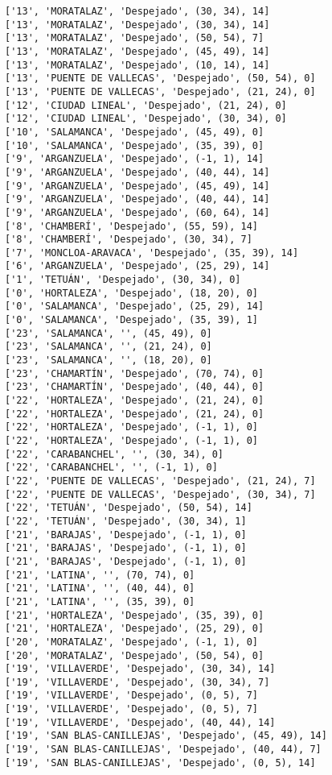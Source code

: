 \documentclass[11pt]{article}
\begin{document}
\begin{Verbatim}[commandchars=\\\{\}]
['13', 'MORATALAZ', 'Despejado', (30, 34), 14]
['13', 'MORATALAZ', 'Despejado', (30, 34), 14]
['13', 'MORATALAZ', 'Despejado', (50, 54), 7]
['13', 'MORATALAZ', 'Despejado', (45, 49), 14]
['13', 'MORATALAZ', 'Despejado', (10, 14), 14]
['13', 'PUENTE DE VALLECAS', 'Despejado', (50, 54), 0]
['13', 'PUENTE DE VALLECAS', 'Despejado', (21, 24), 0]
['12', 'CIUDAD LINEAL', 'Despejado', (21, 24), 0]
['12', 'CIUDAD LINEAL', 'Despejado', (30, 34), 0]
['10', 'SALAMANCA', 'Despejado', (45, 49), 0]
['10', 'SALAMANCA', 'Despejado', (35, 39), 0]
['9', 'ARGANZUELA', 'Despejado', (-1, 1), 14]
['9', 'ARGANZUELA', 'Despejado', (40, 44), 14]
['9', 'ARGANZUELA', 'Despejado', (45, 49), 14]
['9', 'ARGANZUELA', 'Despejado', (40, 44), 14]
['9', 'ARGANZUELA', 'Despejado', (60, 64), 14]
['8', 'CHAMBERÍ', 'Despejado', (55, 59), 14]
['8', 'CHAMBERÍ', 'Despejado', (30, 34), 7]
['7', 'MONCLOA-ARAVACA', 'Despejado', (35, 39), 14]
['6', 'ARGANZUELA', 'Despejado', (25, 29), 14]
['1', 'TETUÁN', 'Despejado', (30, 34), 0]
['0', 'HORTALEZA', 'Despejado', (18, 20), 0]
['0', 'SALAMANCA', 'Despejado', (25, 29), 14]
['0', 'SALAMANCA', 'Despejado', (35, 39), 1]
['23', 'SALAMANCA', '', (45, 49), 0]
['23', 'SALAMANCA', '', (21, 24), 0]
['23', 'SALAMANCA', '', (18, 20), 0]
['23', 'CHAMARTÍN', 'Despejado', (70, 74), 0]
['23', 'CHAMARTÍN', 'Despejado', (40, 44), 0]
['22', 'HORTALEZA', 'Despejado', (21, 24), 0]
['22', 'HORTALEZA', 'Despejado', (21, 24), 0]
['22', 'HORTALEZA', 'Despejado', (-1, 1), 0]
['22', 'HORTALEZA', 'Despejado', (-1, 1), 0]
['22', 'CARABANCHEL', '', (30, 34), 0]
['22', 'CARABANCHEL', '', (-1, 1), 0]
['22', 'PUENTE DE VALLECAS', 'Despejado', (21, 24), 7]
['22', 'PUENTE DE VALLECAS', 'Despejado', (30, 34), 7]
['22', 'TETUÁN', 'Despejado', (50, 54), 14]
['22', 'TETUÁN', 'Despejado', (30, 34), 1]
['21', 'BARAJAS', 'Despejado', (-1, 1), 0]
['21', 'BARAJAS', 'Despejado', (-1, 1), 0]
['21', 'BARAJAS', 'Despejado', (-1, 1), 0]
['21', 'LATINA', '', (70, 74), 0]
['21', 'LATINA', '', (40, 44), 0]
['21', 'LATINA', '', (35, 39), 0]
['21', 'HORTALEZA', 'Despejado', (35, 39), 0]
['21', 'HORTALEZA', 'Despejado', (25, 29), 0]
['20', 'MORATALAZ', 'Despejado', (-1, 1), 0]
['20', 'MORATALAZ', 'Despejado', (50, 54), 0]
['19', 'VILLAVERDE', 'Despejado', (30, 34), 14]
['19', 'VILLAVERDE', 'Despejado', (30, 34), 7]
['19', 'VILLAVERDE', 'Despejado', (0, 5), 7]
['19', 'VILLAVERDE', 'Despejado', (0, 5), 7]
['19', 'VILLAVERDE', 'Despejado', (40, 44), 14]
['19', 'SAN BLAS-CANILLEJAS', 'Despejado', (45, 49), 14]
['19', 'SAN BLAS-CANILLEJAS', 'Despejado', (40, 44), 7]
['19', 'SAN BLAS-CANILLEJAS', 'Despejado', (0, 5), 14]

\end{Verbatim}
\end{document}
